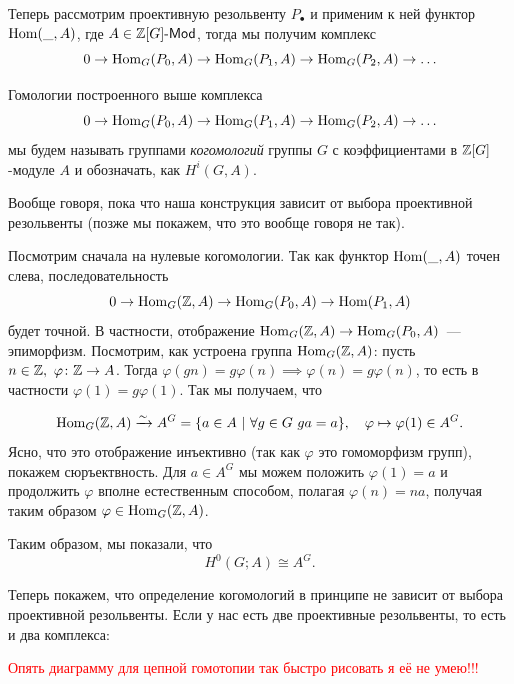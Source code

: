 	Теперь рассмотрим проективную резольвенту $P_{\bullet}$ и применим к ней функтор $\operatorname{Hom}(\_, A)$, где $A \in \mathbb{Z}[G]\text{-}\mathsf{Mod}$, тогда мы получим комплекс 
	\[
		 0 \to \operatorname{Hom}_{G}(P_0, A) \to \operatorname{Hom}_{G}(P_1, A) \to \operatorname{Hom}_{G}(P_2, A) \to \ldots
	\]

	\begin{definition} 
		Гомологии построенного выше комплекса 
		\[
			 0 \to \operatorname{Hom}_{G}(P_0, A) \to \operatorname{Hom}_{G}(P_1, A) \to \operatorname{Hom}_{G}(P_2, A) \to \ldots
		\]
		мы будем называть группами \emph{когомологий} группы $G$ с коэффициентами в $\mathbb{Z}[G]$-модуле $A$ и обозначать, как  $H^{i}(G, A)$.
	\end{definition}

	\begin{remark}
		Вообще говоря, пока что наша конструкция зависит от выбора проективной резольвенты (позже мы покажем, что это вообще говоря не так).
	\end{remark}

	Посмотрим сначала на нулевые когомологии. Так как функтор $\operatorname{Hom}(\_, A)$ точен слева, последовательность 
	\[
		0 \to \operatorname{Hom}_{G}(\mathbb{Z}, A) \to \operatorname{Hom}_{G}(P_0, A) \to \operatorname{Hom}(P_1, A)
	\]
	будет точной. В частности, отображение $\operatorname{Hom}_{G}(\mathbb{Z}, A) \to \operatorname{Hom}_{G}(P_0, A)$~--- эпиморфизм. Посмотрим, как устроена группа $\operatorname{Hom}_{G}(\mathbb{Z}, A)$: пусть $n \in \mathbb{Z}, \ \varphi \colon \mathbb{Z} \to A$. Тогда $\varphi(gn) = g \varphi(n) \implies \varphi(n) = g\varphi(n)$, то есть в частности $\varphi(1) = g \varphi(1)$. Так мы получаем, что 

	\[
		\operatorname{Hom}_{G}(\mathbb{Z}, A) \xrightarrow{\sim} A^{G} = \{ a \in A \ \vert \ \forall g \in G \ ga = a \}, \quad \varphi \mapsto \varphi(1) \in A^{G}. 
	\]
	Ясно, что это отображение инъективно (так как $\varphi$ это гомоморфизм групп), покажем сюръектвность. Для $a \in A^{G}$ мы можем положить $\varphi(1) = a$ и продолжить $\varphi$ вполне естественным способом, полагая $\varphi(n) = na$, получая таким образом $\varphi \in \operatorname{Hom}_{G}(\mathbb{Z}, A)$. 

	Таким образом, мы показали, что 
	\[
		H^{0}(G; A) \cong A^{G}.
	\]

	Теперь покажем, что определение когомологий в принципе не зависит от выбора проективной резольвенты. Если у нас есть две проективные резольвенты, то есть и два комплекса: 

	
	\begin{center}
	\centerline{\textcolor{red}{Опять диаграмму для цепной гомотопии так быстро рисовать я её не умею!!!}}
	\end{center}

